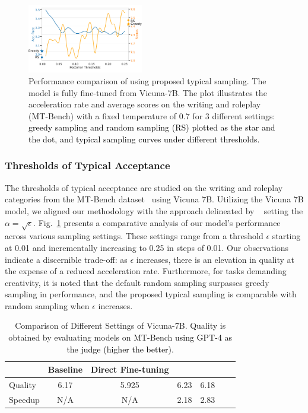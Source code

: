 \begin{figure}[H]
    \centering
    \includegraphics[width=0.45\textwidth]{threshold_ablation_wide.pdf}
    \caption{ Performance comparison of \ours using proposed typical sampling. The model is fully fine-tuned from Vicuna-7B. The plot illustrates the acceleration rate and average scores on the writing and roleplay (MT-Bench) with a fixed temperature of 0.7 for 3 different settings: \textcolor{black}{greedy sampling and random sampling (RS) plotted as the star and the dot, and typical sampling curves under different thresholds.}}
    \label{fig:threshold_ablation}
\end{figure}

\subsubsection{Thresholds of Typical Acceptance}
The thresholds of typical acceptance are studied on the writing and roleplay categories from the MT-Bench dataset~\citep{zheng2023judging} using  Vicuna 7B. 
Utilizing the Vicuna 7B model, we aligned our methodology with the approach delineated by
~\cite{hewitt2022truncation} setting the $\alpha = \sqrt{\epsilon}$. 
Fig.~\ref{fig:threshold_ablation} presents a comparative analysis of our model's performance across various sampling settings.
These settings range from a threshold $\epsilon$ starting at 0.01 and incrementally increasing to 0.25 in steps of 0.01. Our observations indicate a discernible trade-off: as $\epsilon$ increases, there is an elevation in quality at the expense of a reduced acceleration rate. Furthermore, for tasks demanding creativity, it is noted that the default random sampling surpasses greedy sampling in performance, and the proposed typical sampling is comparable with random sampling when $\epsilon$ increases.




\begin{table}[h!]
\centering
\scriptsize
\begin{tabular}{@{}lcccccc@{}}
\toprule
               & Baseline & Direct Fine-tuning &  \ours-1 & \ours-2 \\ \midrule
Quality        & 6.17        & 5.925            & 6.23        & 6.18        \\ 
Speedup       & N/A                & N/A            & 2.18        & 2.83        \\
\bottomrule
\end{tabular}

\caption{Comparison of Different Settings of Vicuna-7B. Quality is obtained by evaluating models on MT-Bench \textcolor{black}{using GPT-4 as the judge (higher the better)}.}
\label{tab:7b settings}
\end{table}


